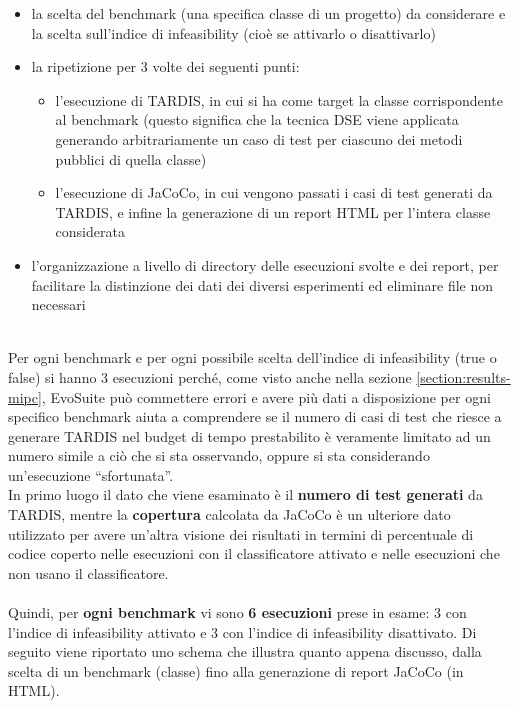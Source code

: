 \documentclass[a4paper, 12pt, oneside]{book}
\newcommand{\qq}[1]{``#1''}
\theoremstyle{normal}
\begin{document}
\begin{itemize}[label=$\bullet$, itemsep=0pt, topsep=2pt]
    \item la scelta del benchmark (una specifica classe di un progetto) da considerare e la scelta sull'indice di infeasibility (cioè se attivarlo o disattivarlo)
    \item la ripetizione per 3 volte dei seguenti punti:
    \begin{itemize}[label={--}, itemsep=0pt, topsep=0pt]
        \item l'esecuzione di TARDIS, in cui si ha come target la classe corrispondente al benchmark (questo significa che la tecnica DSE viene applicata generando arbitrariamente un caso di test per ciascuno dei metodi pubblici di quella classe)
        \item l'esecuzione di JaCoCo, in cui vengono passati i casi di test generati da TARDIS, e infine la generazione di un report HTML per l'intera classe considerata
    \end{itemize}
    \item l'organizzazione a livello di directory delle esecuzioni svolte e dei report, per facilitare la distinzione dei dati dei diversi esperimenti ed eliminare file non necessari
\end{itemize}
\noindent \\ Per ogni benchmark e per ogni possibile scelta dell'indice di infeasibility (true o false) si hanno 3 esecuzioni perché, come visto anche nella sezione \ref{section:results-mipc}, EvoSuite può commettere errori e avere più dati a disposizione per ogni specifico benchmark aiuta a comprendere se il numero di casi di test che riesce a generare TARDIS nel budget di tempo prestabilito è veramente limitato ad un numero simile a ciò che si sta osservando, oppure si sta considerando un'esecuzione \qq{sfortunata}. \\ In primo luogo il dato che viene esaminato è il \textbf{numero di test generati} da TARDIS, mentre la \textbf{copertura} calcolata da JaCoCo è un ulteriore dato utilizzato per avere un'altra visione dei risultati in termini di percentuale di codice coperto nelle esecuzioni con il classificatore attivato e nelle esecuzioni che non usano il classificatore. \\ \\ Quindi, per \textbf{ogni benchmark} vi sono \textbf{6 esecuzioni} prese in esame: 3 con l'indice di infeasibility attivato e 3 con l'indice di infeasibility disattivato.
\clearpage \noindent Di seguito viene riportato uno schema che illustra quanto appena discusso, dalla scelta di un benchmark (classe) fino alla generazione di report JaCoCo (in HTML).
\end{document}
